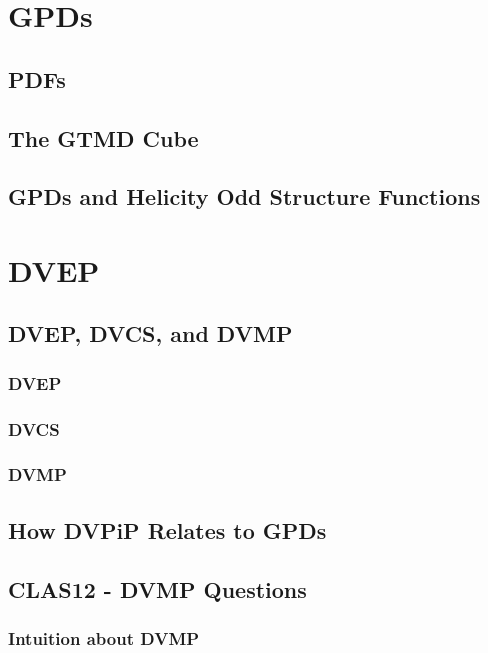     \section{GPDs}
        \subsection{PDFs}
        \subsection{The GTMD Cube}
        \subsection{GPDs and Helicity Odd Structure Functions}
    \section{DVEP}
        \subsection{DVEP, DVCS, and DVMP}
            \subsubsection{DVEP}
            \subsubsection{DVCS}
            \subsubsection{DVMP}
    \subsection{How DVPiP Relates to GPDs}
    \subsection{CLAS12 - DVMP Questions}
        \subsubsection{Intuition about DVMP}

